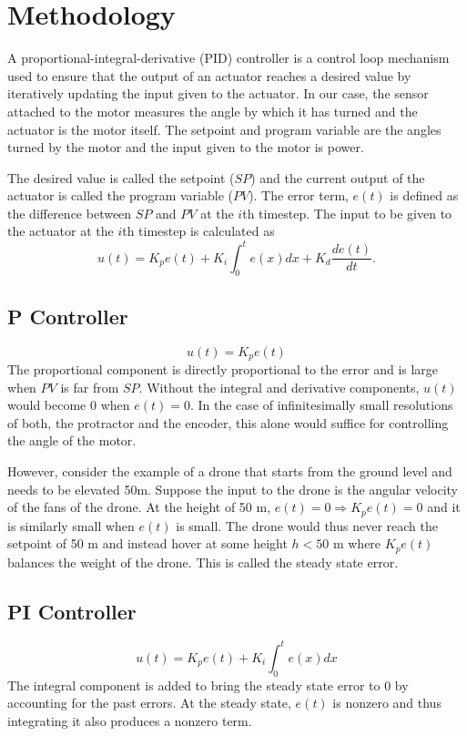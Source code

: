 \documentclass[12pt, a4paper]{article}
\theoremstyle{definition}
\theoremstyle{remark}
\begin{document}
\section{Methodology}
A proportional-integral-derivative (PID) controller is a control loop mechanism used to ensure that the output of an actuator reaches a desired value by iteratively updating the input given to the actuator. In our case, the sensor attached to the motor measures the angle by which it has turned and the actuator is the motor itself. The setpoint and program variable are the angles turned by the motor and the input given to the motor is power.

The desired value is called the setpoint ($SP$) and the current output of the actuator is called the program variable ($PV$). The error term, $e(t)$ is defined as the difference between $SP$ and $PV$ at the $i$th timestep. The input to be given to the actuator at the $i$th timestep is calculated as
\begin{equation}\label{eq:PID}
    u(t) = K_p e(t) + K_i \int_{0}^{t} e(x) dx + K_d \frac{de(t)}{dt}.
\end{equation}

\subsection{P Controller}
\begin{equation}
    u(t) = K_p e(t)
\end{equation}
The proportional component is directly proportional to the error and is large when $PV$ is far from $SP$. Without the integral and derivative components, $u(t)$ would become 0 when $e(t) = 0$. In the case of infinitesimally small resolutions of both, the protractor and the encoder, this alone would suffice for controlling the angle of the motor.

However, consider the example of a drone that starts from the ground level and needs to be elevated 50m. Suppose the input to the drone is the angular velocity of the fans of the drone. At the height of 50 m, $e(t) = 0 \Rightarrow K_p e(t) = 0$ and it is similarly small when $e(t)$ is small. The drone would thus never reach the setpoint of 50 m and instead hover at some height $h < 50$ m where $K_p e(t)$ balances the weight of the drone. This is called the steady state error.

\subsection{PI Controller}
\begin{equation}
    u(t) = K_p e(t) + K_i \int_{0}^{t} e(x) dx
\end{equation}
The integral component is added to bring the steady state error to 0 by accounting for the past errors. At the steady state, $e(t)$ is nonzero and thus integrating it also produces a nonzero term.
\end{document}
